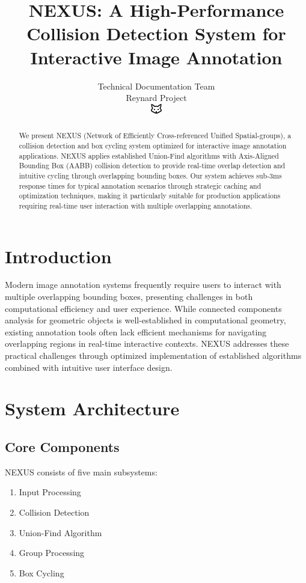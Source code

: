 \documentclass[10pt]{article}
\begin{document}
\title{NEXUS: A High-Performance Collision Detection System for Interactive Image Annotation}

\author{Technical Documentation Team\\
Reynard Project\\
\includegraphics[width=0.5cm]{favicon.pdf}}

\maketitle

\begin{abstract}
We present NEXUS (Network of Efficiently Cross-referenced Unified Spatial-groups), a collision detection and box cycling system optimized for interactive image annotation applications. NEXUS applies established Union-Find algorithms with Axis-Aligned Bounding Box (AABB) collision detection to provide real-time overlap detection and intuitive cycling through overlapping bounding boxes. Our system achieves sub-3ms response times for typical annotation scenarios through strategic caching and optimization techniques, making it particularly suitable for production applications requiring real-time user interaction with multiple overlapping annotations.
\end{abstract}

\section{Introduction}
Modern image annotation systems frequently require users to interact with multiple overlapping bounding boxes, presenting challenges in both computational efficiency and user experience. While connected components analysis for geometric objects is well-established in computational geometry, existing annotation tools often lack efficient mechanisms for navigating overlapping regions in real-time interactive contexts. NEXUS addresses these practical challenges through optimized implementation of established algorithms combined with intuitive user interface design.

\section{System Architecture}
\subsection{Core Components}
NEXUS consists of five main subsystems:
\begin{enumerate}
    \item Input Processing
    \item Collision Detection
    \item Union-Find Algorithm
    \item Group Processing
    \item Box Cycling
\end{enumerate}
\end{document}
